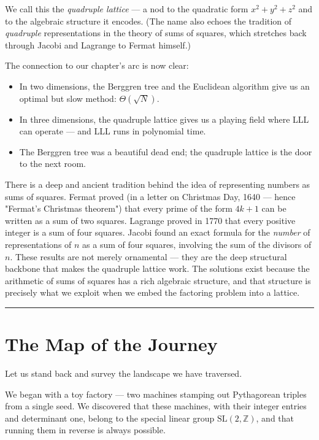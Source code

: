 \documentclass[11pt,openany]{book}
\theoremstyle{definition}
\theoremstyle{plain}
\theoremstyle{remark}
\begin{document}
We call this the \textit{quadruple lattice} — a nod to the quadratic form $x^2 + y^2 + z^2$ and to the algebraic structure it encodes. (The name also echoes the tradition of \textit{quadruple} representations in the theory of sums of squares, which stretches back through Jacobi and Lagrange to Fermat himself.)

The connection to our chapter's arc is now clear:

\begin{itemize}
\item In two dimensions, the Berggren tree and the Euclidean algorithm give us an optimal but slow method: $\Theta(\sqrt{N})$.
\item In three dimensions, the quadruple lattice gives us a playing field where LLL can operate — and LLL runs in polynomial time.
\item The Berggren tree was a beautiful dead end; the quadruple lattice is the door to the next room.
\end{itemize}

There is a deep and ancient tradition behind the idea of representing numbers as sums of squares. Fermat proved (in a letter on Christmas Day, 1640 — hence "Fermat's Christmas theorem") that every prime of the form $4k + 1$ can be written as a sum of two squares. Lagrange proved in 1770 that every positive integer is a sum of four squares. Jacobi found an exact formula for the \textit{number} of representations of $n$ as a sum of four squares, involving the sum of the divisors of $n$. These results are not merely ornamental — they are the deep structural backbone that makes the quadruple lattice work. The solutions exist because the arithmetic of sums of squares has a rich algebraic structure, and that structure is precisely what we exploit when we embed the factoring problem into a lattice.

\bigskip\noindent\rule{\textwidth}{0.4pt}\bigskip


\section*{The Map of the Journey}


Let us stand back and survey the landscape we have traversed.

We began with a toy factory — two machines stamping out Pythagorean triples from a single seed. We discovered that these machines, with their integer entries and determinant one, belong to the special linear group $\mathrm{SL}(2, \mathbb{Z})$, and that running them in reverse is always possible.
\end{document}

